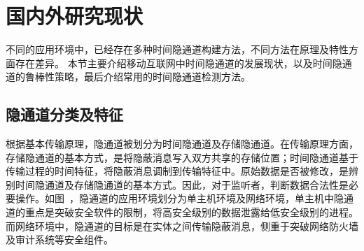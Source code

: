 \section{国内外研究现状}
\label{sec:intro:background}

不同的应用环境中，已经存在多种时间隐通道构建方法，不同方法在原理及特性方面存在差异。
本节主要介绍移动互联网中时间隐通道的发展现状，以及时间隐通道的鲁棒性策略，最后介绍常用的时间隐通道检测方法。

\subsection{隐通道分类及特征}
\label{sec:intro:background:covert-channel}

根据基本传输原理，隐通道被划分为时间隐通道及存储隐通道。在传输原理方面，存储隐通道的基本方式，是将隐蔽消息写入双方共享的存储位置；时间隐通道基于传输过程的时间特征，将隐蔽消息调制到传输特征中。原始数据是否被修改，是辨别时间隐通道及存储隐通道的基本方式。因此，对于监听者，判断数据合法性是必要操作。如图\ ，隐通道的应用环境划分为单主机环境及网络环境，单主机中隐通道的重点是突破安全软件的限制，将高安全级别的数据泄露给低安全级别的进程。而网络环境中，隐通道的目标是在实体之间传输隐蔽消息，侧重于突破网络防火墙及审计系统等安全组件。


